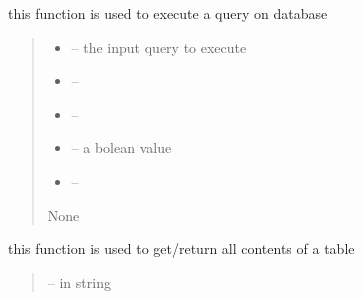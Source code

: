 \documentclass[letterpaper,10pt,english]{sphinxmanual}
\begin{document}
\begin{savenotes}
\begin{fulllineitems}
\begin{savenotes}\begin{fulllineitems}
\label{\detokenize{setting/database:oxin.database.dataBase.execute_quary}}
\pysigstartsignatures
{}
\pysigstopsignatures
\sphinxAtStartPar
this function is used to execute a query on database
\begin{quote}\begin{description}
\begin{itemize}
\item {} 
\sphinxAtStartPar
{} – the input query to execute

\item {} 
\sphinxAtStartPar
{} – 

\item {} 
\sphinxAtStartPar
{} – 

\item {} 
\sphinxAtStartPar
{} – a bolean value

\item {} 
\sphinxAtStartPar
{} – 

\end{itemize}

\sphinxAtStartPar
None

\end{description}\end{quote}

\end{fulllineitems}\end{savenotes}


\begin{savenotes}\begin{fulllineitems}
\label{\detokenize{setting/database:oxin.database.dataBase.get_all_content}}
\pysigstartsignatures
{}
\pysigstopsignatures
\sphinxAtStartPar
this function is used to get/return all contents of a table
\begin{quote}\begin{description}
\sphinxAtStartPar
{} – in string


\end{description}
\end{quote}
\end{fulllineitems}
\end{savenotes}
\end{fulllineitems}
\end{savenotes}
\end{document}
